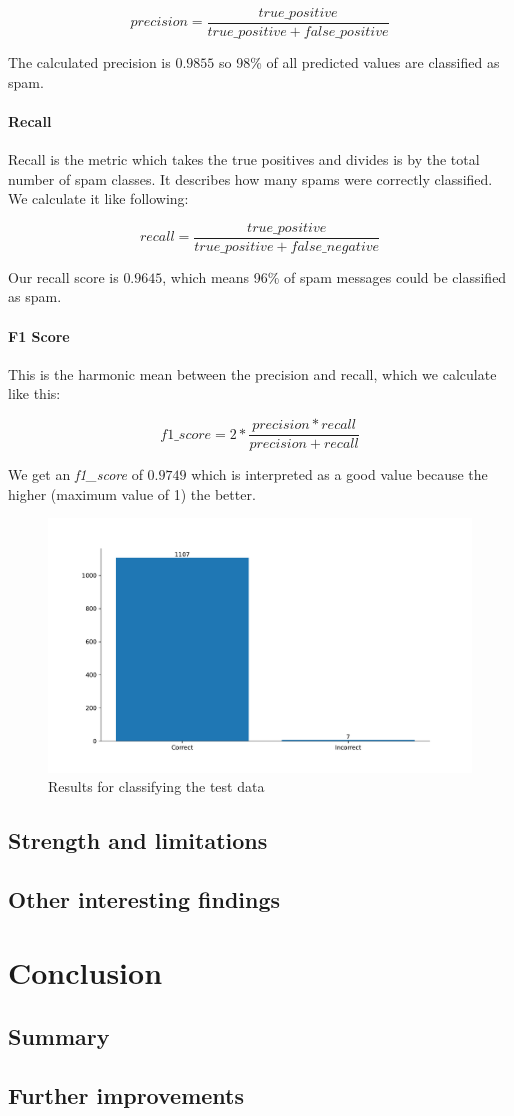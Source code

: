 $$precision = \frac{true\_positive}{true\_positive + false\_positive}$$

The calculated precision is $0.9855$ so 98\% of all predicted values are classified as spam. 

\paragraph{Recall}
Recall is the metric which takes the true positives and divides is by the total number of spam classes. It describes how many spams were correctly classified. We calculate it like following:

$$recall = \frac{true\_positive}{true\_positive + false\_negative}$$

Our recall score is $0.9645$, which means 96\% of spam messages could be classified as spam.

\paragraph{F1 Score}
This is the harmonic mean between the precision and recall, which we calculate like this:

$$f1\_score = 2 *  \frac{precision * recall}{precision + recall}$$

We get an \textit{f1\_score} of $0.9749$ which is interpreted as a good value because the higher (maximum value of 1) the better.

\begin{figure}[htbp]
  \centering
  \includegraphics[width=\textwidth]{images/bar_plot.pdf}
  \caption{Results for classifying the test data}
  \label{test-data-result}
\end{figure}

\subsection{Strength and limitations}

\subsection{Other interesting findings}

\section{Conclusion}

\subsection{Summary}

\subsection{Further improvements}